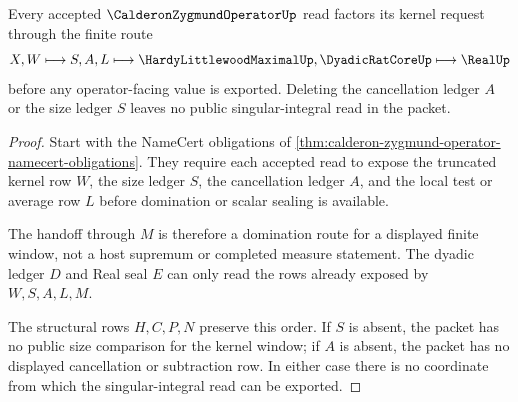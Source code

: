 \begin{theorem}
\label{thm:calderon-zygmund-operator-kernel-cancellation-ledger}
Every accepted $\CalderonZygmundOperatorUp$ read factors its kernel request through the finite route
$$
X,W
\longmapsto
S,A,L
\longmapsto
\HardyLittlewoodMaximalUp,\DyadicRatCoreUp
\longmapsto
\RealUp
$$
before any operator-facing value is exported. Deleting the cancellation ledger $A$ or the size ledger $S$ leaves no public singular-integral read in the packet.
\end{theorem}
\begin{proof}
Start with the NameCert obligations of \autoref{thm:calderon-zygmund-operator-namecert-obligations}. They require each accepted read to expose the truncated kernel row $W$, the size ledger $S$, the cancellation ledger $A$, and the local test or average row $L$ before domination or scalar sealing is available.

The handoff through $M$ is therefore a domination route for a displayed finite window, not a host supremum or completed measure statement. The dyadic ledger $D$ and Real seal $E$ can only read the rows already exposed by $W,S,A,L,M$.

The structural rows $H,C,P,N$ preserve this order. If $S$ is absent, the packet has no public size comparison for the kernel window; if $A$ is absent, the packet has no displayed cancellation or subtraction row. In either case there is no coordinate from which the singular-integral read can be exported.
\end{proof}




